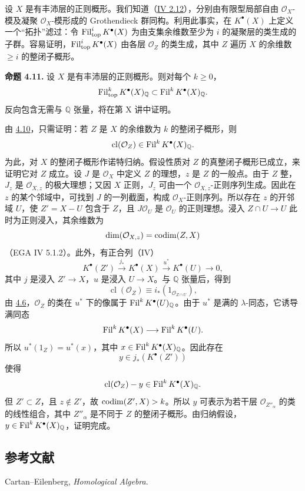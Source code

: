 设 \(X\) 是有丰沛层的正则概形。我们知道（\hyperlink{sga6.e04.para.2-12}{IV 2.12}），分别由有限型局部自由 \(\mathcal O_X\)-模及凝聚 \(\mathcal O_X\)-模形成的 Grothendieck 群同构。利用此事实，在 \(K^\bullet(X)\) 上定义一个“拓扑”滤过：令 \(\operatorname{Fil}_{\mathrm{top}}^iK^\bullet(X)\) 为由支集余维数至少为 \(i\) 的凝聚层的类生成的子群。容易证明，\(\operatorname{Fil}_{\mathrm{top}}^iK^\bullet(X)\) 由各层 \(\mathcal O_Z\) 的类生成，其中 \(Z\) 遍历 \(X\) 的余维数 \(\ge i\) 的整闭子概形。

\textbf{命题 4.11.} 设 \(X\) 是有丰沛层的正则概形。则对每个 \(k\ge0\)，
\[
  \operatorname{Fil}_{\mathrm{top}}^kK^\bullet(X)_{\mathbb Q}
  \subset
  \operatorname{Fil}^kK^\bullet(X)_{\mathbb Q}.
\]
反向包含无需与 \(\mathbb Q\) 张量，将在第 X 讲中证明。

由 \hyperlink{sga6.e07.sec.4.10}{4.10}，只需证明：若 \(Z\) 是 \(X\) 的余维数为 \(k\) 的整闭子概形，则
\[
  \operatorname{cl}(\mathcal O_Z)\in\operatorname{Fil}^kK^\bullet(X)_{\mathbb Q}.
\]
为此，对 \(X\) 的整闭子概形作诺特归纳。假设性质对 \(Z\) 的真整闭子概形已成立，来证明它对 \(Z\) 成立。设 \(J\) 是 \(\mathcal O_X\) 中定义 \(Z\) 的理想，\(z\) 是 \(Z\) 的一般点。由于 \(Z\) 整，\(J_z\) 是 \(\mathcal O_{X,z}\) 的极大理想；又因 \(X\) 正则，\(J_z\) 可由一个 \(\mathcal O_{X,z}\)-正则序列生成。因此在 \(z\) 的某个邻域中，可找到 \(J\) 的一列截面，构成 \(\mathcal O_X\)-正则序列。所以存在 \(z\) 的开邻域 \(U\)，使 \(Z'=X-U\) 包含于 \(Z\)，且 \(J\mathcal O_U\) 是 \(\mathcal O_U\) 的正则理想。浸入 \(Z\cap U\to U\) 此时为正则浸入，其余维数为
\[
  \dim(\mathcal O_{X,z})=\operatorname{codim}(Z,X)
\]
（EGA IV 5.1.2）。此外，有正合列（IV）
\[
  K^\bullet(Z')\xrightarrow{j_*}K^\bullet(X)
  \xrightarrow{u^*}K^\bullet(U)\to0,
\]
其中 \(j\) 是浸入 \(Z'\to X\)，\(u\) 是浸入 \(U\to X\)。与 \(\mathbb Q\) 张量后，得到
\[
  \operatorname{cl}(\mathcal O_Z)
  \equiv i_*(1_{\mathcal O_{Z\cap U}}),
\]
由 \hyperlink{sga6.e07.thm.4-6}{4.6}，\(\mathcal O_Z\) 的类在 \(u^*\) 下的像属于 \(\operatorname{Fil}^kK^\bullet(U)_{\mathbb Q}\)。由于 \(u^*\) 是满的 \(\lambda\)-同态，它诱导满同态
\[
  \operatorname{Fil}^kK^\bullet(X)\longrightarrow \operatorname{Fil}^kK^\bullet(U).
\]
所以 \(u^*(1_Z)=u^*(x)\)，其中 \(x\in\operatorname{Fil}^kK^\bullet(X)_{\mathbb Q}\)。因此存在
\[
  y\in j_*(K^\bullet(Z'))
\]
使得
\[
  \operatorname{cl}(\mathcal O_Z)-y\in\operatorname{Fil}^kK^\bullet(X)_{\mathbb Q}.
\]
但 \(Z'\subset Z\)，且 \(z\notin Z'\)，故 \(\operatorname{codim}(Z',X)>k\)。所以 \(y\) 可表示为若干层 \(\mathcal O_{Z''_\alpha}\) 的类的线性组合，其中 \(Z''_\alpha\) 是不同于 \(Z\) 的整闭子概形。由归纳假设，\(y\in\operatorname{Fil}^kK^\bullet(X)_{\mathbb Q}\)，证明完成。

\subsection*{参考文献}
\begin{enumerate}[label={[\arabic*]}]
\item Cartan--Eilenberg, \emph{Homological Algebra}.
\end{enumerate}



\providecommand{\etale}{\'etale}
\providecommand{\Ch}{\operatorname{Ch}}



